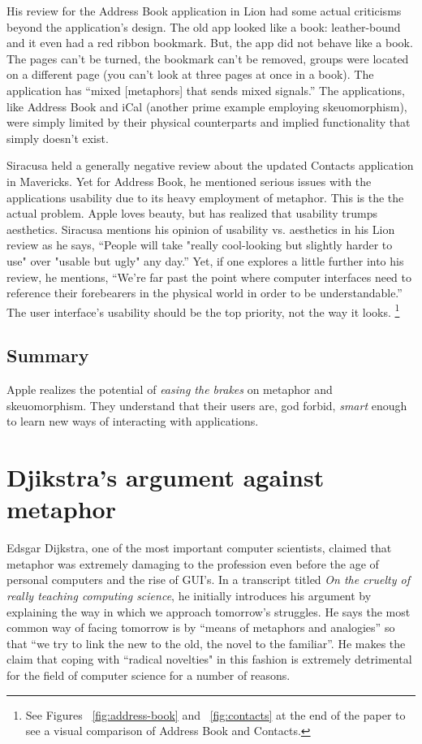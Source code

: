 \documentclass[11pt, oneside]{article}
\begin{document}
His review for the Address Book application in Lion had some actual criticisms beyond the application's design. The old app looked like a book: leather-bound and it even had a red ribbon bookmark. But, the app did not behave like a book. The pages can't be turned, the bookmark can't be removed, groups were located on a different page (you can't look at three pages at once in a book). The application has ``mixed [metaphors] that sends mixed signals.''  The applications, like Address Book and iCal (another prime example employing skeuomorphism), were simply limited by their physical counterparts and implied functionality that simply doesn't exist. \cite{ars-technica-lion}

Siracusa held a generally negative review about the updated Contacts application in Mavericks. Yet for Address Book, he mentioned serious issues with the applications usability due to its heavy employment of metaphor. This is the the actual problem. Apple loves beauty, but has realized that usability trumps aesthetics. Siracusa mentions his opinion of usability vs. aesthetics in his Lion review as he says, ``People will take "really cool-looking but slightly harder to use" over "usable but ugly" any day.'' Yet, if one explores a little further into his review, he mentions, ``We're far past the point where computer interfaces need to reference their forebearers in the physical world in order to be understandable.'' The user interface's usability should be the top priority, not the way it looks. \footnote{See Figures ~\ref{fig:address-book} and ~\ref{fig:contacts} at the end of the paper to see a visual comparison of Address Book and Contacts.}
 
\subsection{Summary}
Apple realizes the potential of \textit{easing the brakes} on metaphor and skeuomorphism. They understand that their users are, god forbid, \textit{smart} enough to learn new ways of interacting with applications.

\section{Djikstra's argument against metaphor}
Edsgar Dijkstra, one of the most important computer scientists, claimed that metaphor was extremely damaging to the profession even before the age of personal computers and the rise of GUI's. In a transcript titled \textit{On the cruelty of really teaching computing science}, he initially introduces his argument by explaining the way in which we approach tomorrow's struggles. He says the most common way of facing tomorrow is by ``means of metaphors and analogies'' so that ``we try to link the new to the old, the novel to the familiar''. He makes the claim that coping with ``radical novelties" in this fashion is extremely detrimental for the field of computer science for a number of reasons.
\end{document}
